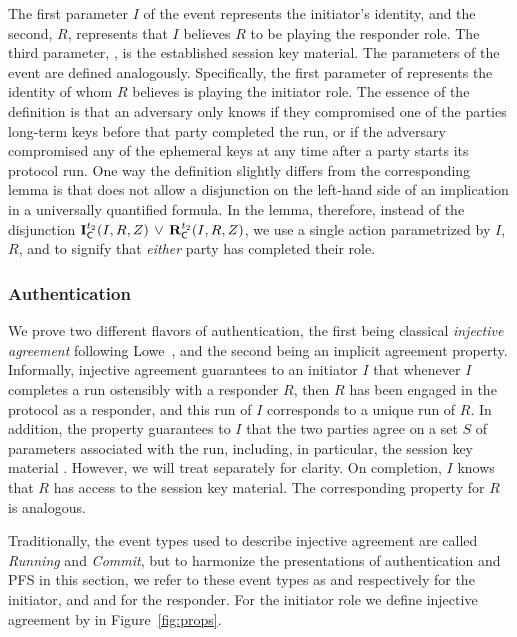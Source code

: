 The first parameter $I$ of the \mIComplete{} event represents the
initiator's identity,
and the second, $R$, represents that $I$ believes $R$ to be playing
the responder role.
%
The third parameter, \mSessKey{}, is the established session key material.
%
The parameters of the \mRComplete{} event are defined analogously.
%
Specifically, the first parameter of \mRComplete{} represents the identity of
whom $R$ believes is playing the initiator role.
%
The essence of the definition is that an adversary only knows \mSessKey{} if they
compromised one of the
parties long-term keys before that party completed the run, or if the adversary
compromised any of the ephemeral keys at any time after a party starts
its protocol run.
%
One way the definition slightly differs from the corresponding \mTamarin{} lemma
is that \mTamarin{} does not allow a disjunction on the left-hand side of an
implication in a universally quantified formula.
%
In the lemma, therefore, instead of the disjunction
$\mathbf{I}_{\textsf{C}}^{t_2}(I, R, Z)\, \lor\,  \mathbf{R}_{\textsf{C}}^{t_2}(I, R, Z)$,
we use a single action parametrized by $I$, $R$, and \mSessKey{} to signify that
\emph{either} party has completed their role.
%

\subsubsection{Authentication}
\label{sec:authenticationDef}
We prove two different flavors of authentication, the first being classical
\emph{injective agreement} following Lowe~\cite{DBLP:conf/csfw/Lowe97a}, and
the second being an implicit agreement property.
%
Informally, injective agreement guarantees to an initiator $I$ that whenever
$I$ completes a run ostensibly with a responder $R$,
then $R$ has been engaged in the protocol as a responder,
and this run of $I$ corresponds to a unique run of $R$.
%
In addition, the property guarantees to $I$ that the two parties agree on a set
$S$ of parameters associated with the run, including, in particular, the
session key material \mSessKey{}.
%
However, we will treat \mSessKey{} separately for clarity.
%
On completion, $I$ knows that $R$ has access to the session key material.
%
The corresponding property for $R$ is analogous.
%

Traditionally, the event types used to describe injective agreement are called
\emph{Running} and \emph{Commit}, but to harmonize the presentations of
authentication and PFS in this section, we refer to these event types as
\mIStart{} and \mIComplete{} respectively for the initiator, and
\mRStart{} and \mRComplete{} for the responder.
%
For the initiator role we define injective agreement by
\mPredInjI{} in Figure~\ref{fig:props}.

